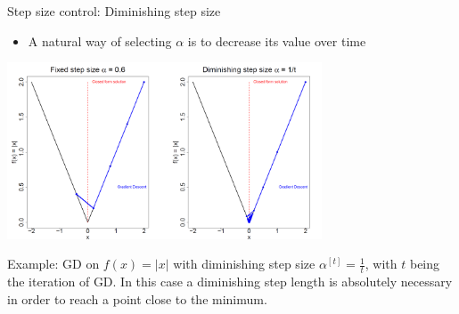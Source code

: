 	\begin{vbframe}{Step size control: Diminishing step size}
		\begin{itemize}
			\item A natural way of selecting $\alpha$ is to decrease its value over time
		\end{itemize}

		\begin{center}
			\includegraphics[width = 0.7\textwidth]{figure_man/example-GD.png} \\
			\begin{footnotesize} Example: GD on $f(x) = |x|$ with diminishing step size $\alpha^{[t]} = \frac{1}{t}$, with $t$ being the iteration of GD. In this case a diminishing step length is absolutely necessary in order to reach a point close to the minimum.
			\end{footnotesize}
		\end{center}
		
	\end{vbframe}	
	
